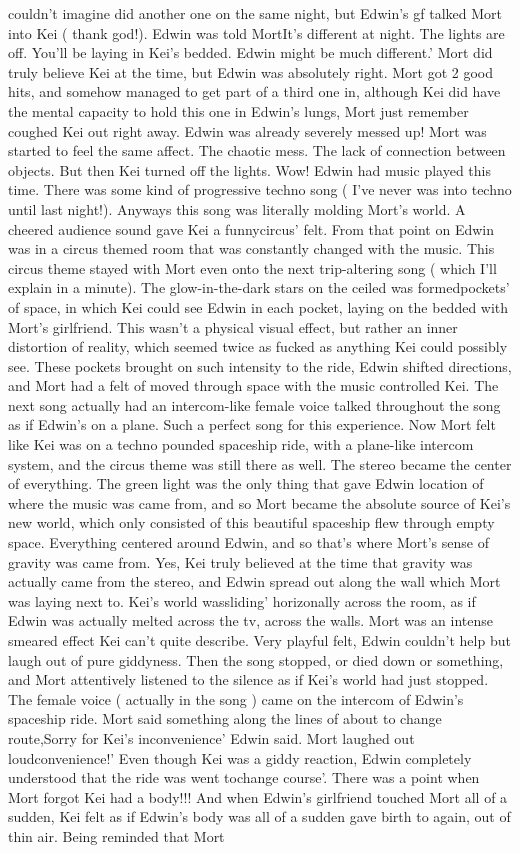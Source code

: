 \documentclass[12pt]{book}
\begin{document}
couldn't imagine did another one on the same night, but Edwin's gf talked Mort into Kei ( thank god!). Edwin was told MortIt's different at night. The lights are off. You'll be laying in Kei's bedded. Edwin might be much different.' Mort did truly believe Kei at the time, but Edwin was absolutely right. Mort got 2 good hits, and somehow managed to get part of a third one in, although Kei did have the mental capacity to hold this one in Edwin's lungs, Mort just remember coughed Kei out right away. Edwin was already severely messed up! Mort was started to feel the same affect. The chaotic mess. The lack of connection between objects. But then Kei turned off the lights. Wow! Edwin had music played this time. There was some kind of progressive techno song ( I've never was into techno until last night!). Anyways this song was literally molding Mort's world. A cheered audience sound gave Kei a funnycircus' felt. From that point on Edwin was in a circus themed room that was constantly changed with the music. This circus theme stayed with Mort even onto the next trip-altering song ( which I'll explain in a minute). The glow-in-the-dark stars on the ceiled was formedpockets' of space, in which Kei could see Edwin in each pocket, laying on the bedded with Mort's girlfriend. This wasn't a physical visual effect, but rather an inner distortion of reality, which seemed twice as fucked as anything Kei could possibly see. These pockets brought on such intensity to the ride, Edwin shifted directions, and Mort had a felt of moved through space with the music controlled Kei. The next song actually had an intercom-like female voice talked throughout the song as if Edwin's on a plane. Such a perfect song for this experience. Now Mort felt like Kei was on a techno pounded spaceship ride, with a plane-like intercom system, and the circus theme was still there as well. The stereo became the center of everything. The green light was the only thing that gave Edwin location of where the music was came from, and so Mort became the absolute source of Kei's new world, which only consisted of this beautiful spaceship flew through empty space. Everything centered around Edwin, and so that's where Mort's sense of gravity was came from. Yes, Kei truly believed at the time that gravity was actually came from the stereo, and Edwin spread out along the wall which Mort was laying next to. Kei's world wassliding' horizonally across the room, as if Edwin was actually melted across the tv, across the walls. Mort was an intense smeared effect Kei can't quite describe. Very playful felt, Edwin couldn't help but laugh out of pure giddyness. Then the song stopped, or died down or something, and Mort attentively listened to the silence as if Kei's world had just stopped. The female voice ( actually in the song ) came on the intercom of Edwin's spaceship ride. Mort said something along the lines of about to change route,Sorry for Kei's inconvenience' Edwin said. Mort laughed out loudconvenience!' Even though Kei was a giddy reaction, Edwin completely understood that the ride was went tochange course'. There was a point when Mort forgot Kei had a body!!! And when Edwin's girlfriend touched Mort all of a sudden, Kei felt as if Edwin's body was all of a sudden gave birth to again, out of thin air. Being reminded that Mort 
\end{document}
